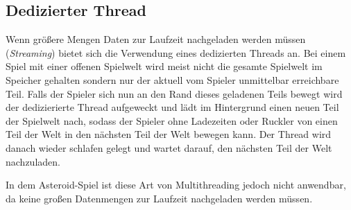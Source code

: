 \documentclass[12pt, a4paper, titlepage, hidelinks]{scrreprt}
\begin{document}

\subsection{Dedizierter Thread}
Wenn größere Mengen Daten zur Laufzeit nachgeladen werden müssen (\textit{Streaming}) bietet sich die Verwendung eines dedizierten Threads an. Bei einem Spiel mit einer offenen Spielwelt wird meist nicht die gesamte Spielwelt im Speicher gehalten sondern nur der aktuell vom Spieler unmittelbar erreichbare Teil. Falls der Spieler sich nun an den Rand dieses geladenen Teils bewegt wird der dedizierierte Thread aufgeweckt und lädt im Hintergrund einen neuen Teil der Spielwelt nach, sodass der Spieler ohne Ladezeiten oder Ruckler von einen Teil der Welt in den nächsten Teil der Welt bewegen kann. Der Thread wird danach wieder schlafen gelegt und wartet darauf, den nächsten Teil der Welt nachzuladen.

In dem Asteroid-Spiel ist diese Art von Multithreading jedoch nicht anwendbar, da keine großen Datenmengen zur Laufzeit nachgeladen werden müssen.
\end{document}
